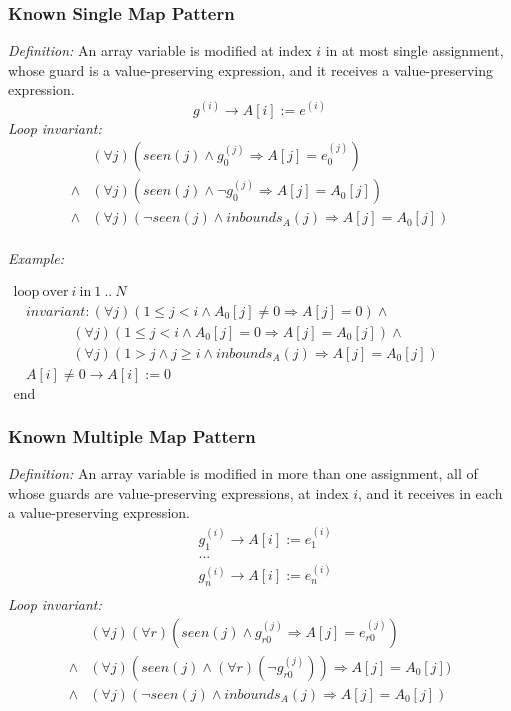 \documentclass[a4paper,10pt]{article}
\newcommand{\idx}{\ensuremath{i}\xspace}
\newcommand{\at}[1]{{(#1)}}
\newcommand{\KWloop}{\ensuremath{\mathrm{loop}~}}
\newcommand{\KWend}{\ensuremath{\mathrm{end}~}}
\newcommand{\KWover}{\ensuremath{\mathrm{over}~}}
\newcommand{\KWin}{\ensuremath{~\mathrm{in}~}}
\newcommand{\impl}{\ensuremath{\Longrightarrow}}
\newcommand{\inbounds}[2]{\ensuremath{\mathit{inbounds}_{#1}(#2)}\xspace}
\newcommand{\seen}[1]{\ensuremath{\mathit{seen}(#1)}\xspace}
\newcommand{\loopinvariant}{\noindent\textit{Loop invariant:}\xspace}
\newcommand{\patterndef}{\noindent\textit{Definition:}\xspace}
\newcommand{\patternexample}{\noindent\textit{Example:}\xspace}
\begin{document}
\subsubsection*{Known Single Map Pattern}

\patterndef An array variable is modified at index \idx in at most single assignment, whose
guard is a value-preserving expression, and it receives a value-preserving expression.
%
$$g^\at{\idx} \rightarrow A[\idx] := e^\at{\idx}$$
%
\loopinvariant
%
\begin{eqnarray*}
&(\forall j)(\seen{j} \land g_0^\at{j} \impl A[j] = e_0^\at{j}) \\
\land&(\forall j)(\seen{j} \land \neg g_0^\at{j} \impl A[j] = A_0[j]) \\
\land&
 (\forall j)(\neg \seen{j} \land \inbounds{A}{j} \impl A[j] = A_0[j])\\
\end{eqnarray*}

\bigskip
\patternexample

\medskip
$\begin{array}{l}
  \KWloop \KWover i \KWin 1~..~N \\
  ~~~~ \textit{invariant}: (\forall j)(1 \leq j < i \land A_0[j] \neq 0 \impl A[j] = 0) \land\\
  ~~~~~~~~~~~~~~~~~~~ (\forall j)(1 \leq j < i \land A_0[j] = 0 \impl A[j] = A_0[j]) \land\\
  ~~~~~~~~~~~~~~~~~~~ (\forall j)(1 > j \land j \geq i \land \inbounds{A}{j} \impl A[j] = A_0[j])\\
  ~~~~ A[i] \neq 0 \rightarrow A[i] := 0\\
  \KWend
\end{array}$

\subsubsection*{Known Multiple Map Pattern}

\patterndef An array variable is modified in more than one assignment, all
of whose guards are value-preserving expressions, at index \idx, and it receives in each a
value-preserving expression.
%
\begin{eqnarray*}
&g_1^\at{\idx} \rightarrow A[\idx] := e_1^\at{\idx}\\
&...\\
&g_n^\at{\idx} \rightarrow A[\idx] := e_n^\at{\idx}\\
\end{eqnarray*}
%
\loopinvariant
%
\begin{eqnarray*}
&(\forall j)(\forall r)(\seen{j} \land g_{r0}^\at{j} \impl A[j] = e_{r0}^\at{j}) \\
\land&(\forall j)(\seen{j} \land (\forall r) (\neg g_{r0}^\at{j})) \impl A[j] = A_0[j]) \\
\land&
 (\forall j)(\neg \seen{j} \land \inbounds{A}{j} \impl A[j] = A_0[j])\\
\end{eqnarray*}
\end{document}
